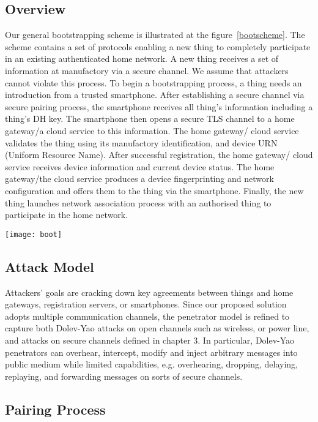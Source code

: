 \subsection{Overview}

Our general bootstrapping scheme is illustrated at the figure~\ref{bootscheme}. The scheme contains a set of protocols enabling a new thing to completely participate in an existing authenticated home network. A new thing receives a set of information at manufactory via a secure channel. We assume that attackers cannot violate this process. To begin a bootstrapping process, a thing needs an introduction from a trusted smartphone. After establishing a secure channel via secure pairing process, the smartphone receives all thing's information including a thing's DH key. The smartphone then opens a secure TLS channel to a home gateway/a cloud service to this information. The home gateway/ cloud service validates the thing using its manufactory identification, and device URN (Uniform Resource Name). After successful registration, the home gateway/ cloud service receives device information and current device status. The home gateway/the cloud service produces a device fingerprinting and network configuration and offers them to the thing via the smartphone. Finally, the new thing launches network association process with an authorised thing to participate in the home network. 

\begin{figure*}
  \centering
  \texttt{[image: boot]}
  \caption{Secure Bootstrapping Scheme}
  \label{bootscheme}
\end{figure*}

\subsection{Attack Model}
Attackers' goals are cracking down key agreements between things and home gateways, registration servers, or smartphones. Since our proposed solution adopts multiple communication channels, the penetrator model is refined to capture both Dolev-Yao attacks on open channels such as wireless, or power line, and attacks on secure channels defined in chapter 3. In particular, Dolev-Yao penetrators can overhear, intercept, modify and inject arbitrary messages into public medium while limited capabilities, e.g. overhearing, dropping, delaying, replaying, and forwarding messages on sorts of secure channels. 

\subsection{Pairing Process}

